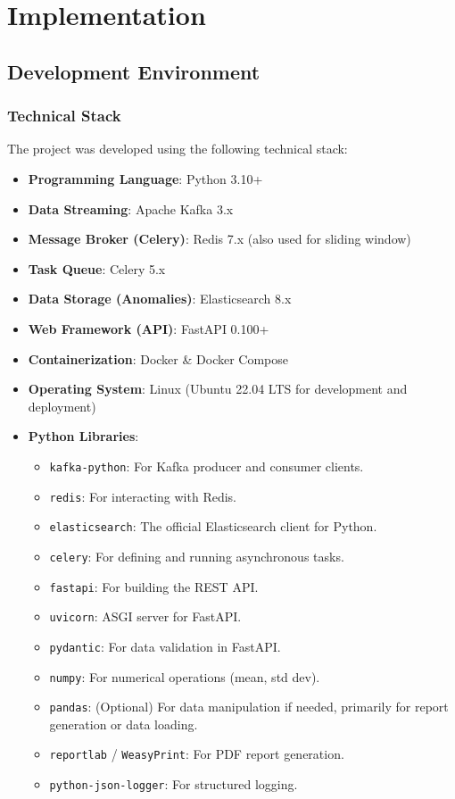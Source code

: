 \chapter{Implementation}

\section{Development Environment}

\subsection{Technical Stack}

The project was developed using the following technical stack:
\begin{itemize}
    \item \textbf{Programming Language}: Python 3.10+
    \item \textbf{Data Streaming}: Apache Kafka 3.x
    \item \textbf{Message Broker (Celery)}: Redis 7.x (also used for sliding window)
    \item \textbf{Task Queue}: Celery 5.x
    \item \textbf{Data Storage (Anomalies)}: Elasticsearch 8.x
    \item \textbf{Web Framework (API)}: FastAPI 0.100+
    \item \textbf{Containerization}: Docker \& Docker Compose
    \item \textbf{Operating System}: Linux (Ubuntu 22.04 LTS for development and deployment)
    \item \textbf{Python Libraries}:
    \begin{itemize}
        \item \texttt{kafka-python}: For Kafka producer and consumer clients.
        \item \texttt{redis}: For interacting with Redis.
        \item \texttt{elasticsearch}: The official Elasticsearch client for Python.
        \item \texttt{celery}: For defining and running asynchronous tasks.
        \item \texttt{fastapi}: For building the REST API.
        \item \texttt{uvicorn}: ASGI server for FastAPI.
        \item \texttt{pydantic}: For data validation in FastAPI.
        \item \texttt{numpy}: For numerical operations (mean, std dev).
        \item \texttt{pandas}: (Optional) For data manipulation if needed, primarily for report generation or data loading.
        \item \texttt{reportlab} / \texttt{WeasyPrint}: For PDF report generation.
        \item \texttt{python-json-logger}: For structured logging.
    \end{itemize}
\end{itemize}

